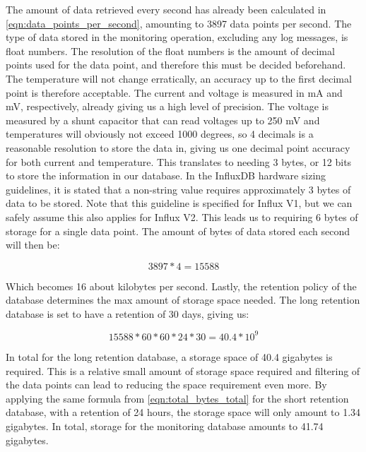 \documentclass[main.tex]{subfiles}
\begin{document}
The amount of data retrieved every second has already been calculated in \autoref{eqn:data_points_per_second}, amounting to 3897 data points per second. The type of data stored in the monitoring operation, excluding any log messages, is float numbers. The resolution of the float numbers is the amount of decimal points used for the data point, and therefore this must be decided beforehand. The temperature will not change erratically, an accuracy up to the first decimal point is therefore acceptable. The current and voltage is measured in mA and mV, respectively, already giving us a high level of precision. The voltage is measured by a shunt capacitor that can read voltages up to 250 mV and temperatures will obviously not exceed 1000 degrees, so 4 decimals is a reasonable resolution to store the data in, giving us one decimal point accuracy for both current and temperature. This translates to needing 3 bytes, or 12 bits to store the information in our database. In the InfluxDB hardware sizing guidelines, it is stated that a non-string value requires approximately 3 bytes of data to be stored. Note that this guideline is specified for Influx V1, but we can safely assume this also applies for Influx V2. This leads us to requiring 6 bytes of storage for a single data point. The amount of bytes of data stored each second will then be: 

\begin{equation} \label{eqn:total_bytes_per_second}
3897*4 = 15588 
\end{equation}

Which becomes 16 about kilobytes per second. Lastly, the retention policy of the database determines the max amount of storage space needed. The long retention database is set to have a retention of 30 days, giving us:

\begin{equation} \label{eqn:total_bytes_total}
15588*60*60*24*30 = 40.4 * 10^9
\end{equation}

In total for the long retention database, a storage space of 40.4 gigabytes is required. This is a relative small amount of storage space required and filtering of the data points can lead to reducing the space requirement even more. By applying the same formula from \autoref{eqn:total_bytes_total} for the short retention database, with a retention of 24 hours, the storage space will only amount to 1.34 gigabytes. In total, storage for the monitoring database amounts to 41.74 gigabytes.
\end{document}
